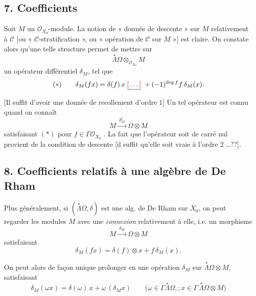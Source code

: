 \documentclass[11pt,a4paper]{article}
\begin{document}
\subsection*{7. Coefficients}

 Soit $M$ un
$\mathcal{O}_{X_0}$-module. La notion de « donnée de descente » sur $M$
relativement à $\mathcal{C}$ [ou « $\mathcal{C}$-stratification », ou
« opération de $\mathcal{C}$ sur $M$ »] est claire. On constate alors
qu'une telle structure permet de mettre sur
\[
\overset{*}{\Lambda}\Omega \otimes_{\mathcal{O}_{X_0}} M
\]
un opérateur différentiel $\delta_M$, tel que
\[
(*)\qquad \delta_M(fx) = \delta(f)\,x \;\struck{\ill{}}\; + (-1)^{\deg f} f\,\delta_M(x) .
\]
[Il suffit d'avoir une donnée de recollement d'ordre $1$]
Un tel opérateur est connu quand on connaît
\[
M \xrightarrow{\ \delta^1_M\ } \Omega \otimes M
\]
satisfaisant $(*)$ \struck{\ill{}} pour $f \in \Gamma\mathcal{O}_{X_0}$
. La fait
que l'opérateur   soit de carré nul
provient de la condition de descente [il suffit qu'elle soit
vraie à l'ordre 2 …??].

\subsection*{8. Coefficients relatifs à une algèbre de De Rham}

Plus généralement, si $(\overset{*}{\Lambda}\Omega, \delta)$ est une
alg. de De Rham sur $X_0$, on peut regarder les modules $M$ avec une
\emph{connexion} relativement à elle, i.e. un morphisme
\[
M \xrightarrow{\ \delta_M\ } \Omega \otimes M
\]
satisfaisant
\[
\delta_M(fx) = \delta(f) \otimes x + f\,\delta_M(x) .
\]

On peut alors de façon unique prolonger en une 
opération $\delta_M$ sur $\overset{*}{\Lambda}\Omega \otimes M$,
satisfaisant
\[
\delta_M(\omega x) = \delta(\omega)\, x + \omega\,(\delta_M x)
\qquad \big(\omega \in \Gamma\overset{*}{\Lambda}\Omega,;
x \in \Gamma\,\overset{*}{\Lambda}\Omega \otimes M\big)
\]
\end{document}
